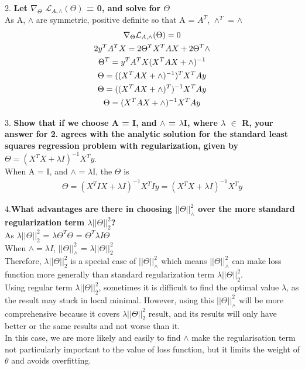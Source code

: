 \documentclass{article}
\begin{document}
2. \textbf{Let $\nabla_\Theta$ $\mathcal{L}_{A,\wedge}(\Theta)$ = \textbf{0}, and solve for \textbf{$\Theta$}}\\
As A, $\wedge$ are symmetric, positive definite so that A = $A^T$, $\wedge^T$ = $\wedge$
\begin{gather}
\nabla_\Theta \mathcal{L}_{A,\wedge}(\Theta) = 0 \notag \\
2y^T A^T X = 2\Theta^T X^T A X + 2\Theta^T\wedge \notag \\
\Theta^T = y^TA^TX(X^T AX + \wedge)^{-1} \notag \\
\Theta = ((X^T AX + \wedge)^{-1})^{T} X^T A y \notag \\
\Theta = ((X^T AX + \wedge)^{T})^{-1} X^T A y \notag \\
\Theta = (X^TAX + \wedge)^{-1} X^T Ay
\end{gather}

3. \textbf{Show that if we choose A = I, and $\wedge$ = $\lambda$I, where $\lambda$ $\in$ R, your answer for 2. agrees with the analytic solution for the standard least squares regression problem with regularization, given by $\Theta = (X^T X + \lambda I)^{-1}X^T y$}.\\

When A = I, and $\wedge$ = $\lambda$I, the $\Theta$ is 
\begin{gather}
\Theta = (X^T I X + \lambda I)^{-1} X^T I y = (X^T X + \lambda I)^{-1}X^T y
\end{gather}

4.\textbf{What advantages are there in choosing $||\Theta||^2_{\wedge}$ over the more standard regularization term $\lambda||\Theta||^2_{2}$?}\\

As $\lambda||\Theta||^2_{2}$ = $\lambda \Theta^T \Theta $ = $\Theta^T \lambda I \Theta$\\
When $\wedge = \lambda I$, $||\Theta||^2_\wedge$ = $\lambda||\Theta||^2_{2}$\\
Therefore,  $\lambda||\Theta||^2_{2}$ is a special case of $||\Theta||^2_\wedge$ which means $||\Theta||^2_\wedge$ can make loss function more generally than standard regularization term $\lambda ||\Theta||_2^2$. \\
Using regular term $\lambda ||\Theta||_2^2$, sometimes it is difficult to find the optimal value $\lambda$, as the result may stuck in local minimal. However, using this $||\Theta||_\wedge^2$ will be more comprehensive because it covers $\lambda ||\Theta||_2^2$ result, and its results will only have better or the same results and not worse than it.\\ 
In this case, we are more likely and easily to find $\wedge$ make the regularisation term not particularly important to the value of loss function, but it limits the weight of $\theta$ and avoids overfitting.\\
\end{document}
